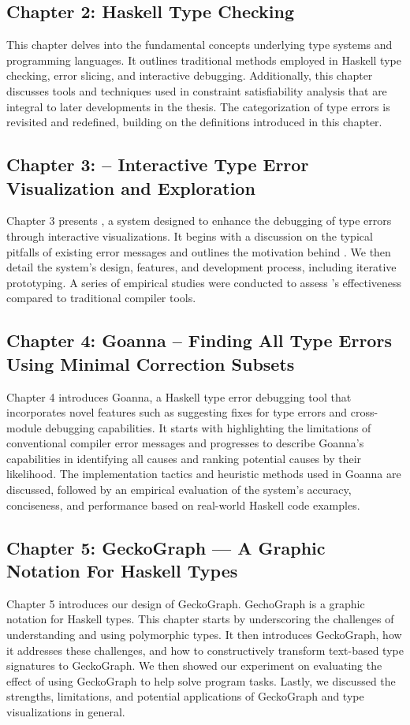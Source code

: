 \subsection*{Chapter 2: Haskell Type Checking}
This chapter delves into the fundamental concepts underlying type systems and programming languages. It outlines traditional methods employed in Haskell type checking, error slicing, and interactive debugging. Additionally, this chapter discusses tools and techniques used in constraint satisfiability analysis that are integral to later developments in the thesis. The categorization of type errors is revisited and redefined, building on the definitions introduced in this chapter.
    
\subsection*{Chapter 3: \chameleon{} -- Interactive Type Error Visualization and Exploration}
Chapter 3 presents \chameleon{}, a system designed to enhance the debugging of type errors through interactive visualizations. It begins with a discussion on the typical pitfalls of existing error messages and outlines the motivation behind \chameleon{}. We then detail the system's design, features, and development process, including iterative prototyping. A series of empirical studies were conducted to assess \chameleon{}'s effectiveness compared to traditional compiler tools.
    
\subsection*{Chapter 4: Goanna -- Finding All Type Errors Using Minimal Correction Subsets}
Chapter 4 introduces Goanna, a Haskell type error debugging tool that incorporates novel features such as suggesting fixes for type errors and cross-module debugging capabilities. It starts with highlighting the limitations of conventional compiler error messages and progresses to describe Goanna's capabilities in identifying all causes and ranking potential causes by their likelihood. The implementation tactics and heuristic methods used in Goanna are discussed, followed by an empirical evaluation of the system's accuracy, conciseness, and performance based on real-world Haskell code examples.
    
\subsection*{Chapter 5: GeckoGraph — A Graphic Notation For Haskell Types}
Chapter 5 introduces our design of GeckoGraph. GechoGraph is a graphic notation for Haskell types. This chapter starts by underscoring the challenges of understanding and using polymorphic types. It then introduces GeckoGraph, how it addresses these challenges, and how to constructively transform text-based type signatures to GeckoGraph. We then showed our experiment on evaluating the effect of using GeckoGraph to help solve program tasks. Lastly, we discussed the strengths, limitations, and potential applications of GeckoGraph and type visualizations in general.   
    
